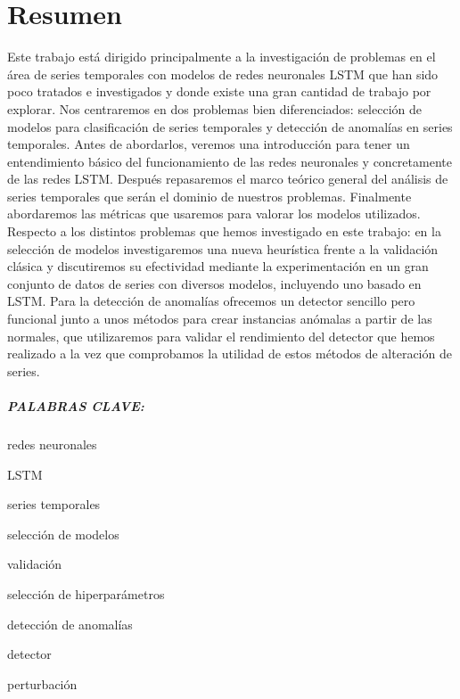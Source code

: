 %


\chapter*{Resumen}\label{ch:resumen}

Este trabajo está dirigido principalmente a la investigación de problemas en el área de series temporales con modelos de redes neuronales LSTM que han sido poco tratados e investigados y donde existe una gran cantidad de trabajo por explorar. Nos centraremos en dos problemas bien diferenciados: selección de modelos para clasificación de series temporales y detección de anomalías en series temporales. Antes de abordarlos, veremos una introducción para tener un entendimiento básico del funcionamiento de las redes neuronales y concretamente de las redes LSTM. Después repasaremos el marco teórico general del análisis de series temporales que serán el dominio de nuestros problemas. Finalmente abordaremos las métricas que usaremos para valorar los modelos utilizados. Respecto a los distintos problemas que hemos investigado en este trabajo: en la selección de modelos investigaremos una nueva heurística frente a la validación clásica y discutiremos su efectividad mediante la experimentación en un gran conjunto de datos de series con diversos modelos, incluyendo uno basado en LSTM. Para la detección de anomalías ofrecemos un detector sencillo pero funcional junto a unos métodos para crear instancias anómalas a partir de las normales, que utilizaremos para validar el rendimiento del detector que hemos realizado a la vez que comprobamos la utilidad de estos métodos de alteración de series.

\paragraph{PALABRAS CLAVE:}
\begin{itemize*}[label=,itemsep=1em,itemjoin=\hspace{1em}]
  \item redes neuronales
  \item LSTM
  \item series temporales
  \item selección de modelos
  \item validación
  \item selección de hiperparámetros
  \item detección de anomalías
  \item detector
  \item perturbación
\end{itemize*}

\endinput
